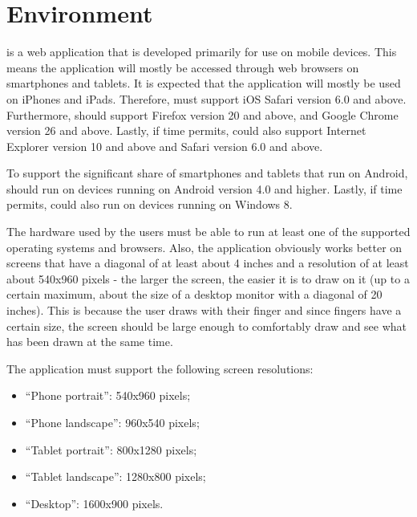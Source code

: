 \section{Environment}
\label{sec:env}
\projectname{} is a web application that is developed primarily for use on mobile devices. This means the application will mostly be accessed through web browsers on smartphones and tablets. It is expected that the application will mostly be used on iPhones and iPads. Therefore, \projectname{} must support iOS Safari version 6.0 and above. Furthermore, \projectname{} should support Firefox version 20 and above, and Google Chrome version 26 and above. Lastly, if time permits, \projectname{} could also support Internet Explorer version 10 and above and Safari version 6.0 and above.

To support the significant share of smartphones and tablets that run on Android, \projectname{} should run on devices running on Android version 4.0 and higher. Lastly, if time permits, \projectname{} could also run on devices running on Windows 8.

The hardware used by the users must be able to run at least one of the supported operating systems and browsers. Also, the application obviously works better on screens that have a diagonal of at least about 4 inches and a resolution of at least about 540x960 pixels - the larger the screen, the easier it is to draw on it (up to a certain maximum, about the size of a desktop monitor with a diagonal of 20 inches). This is because the user draws with their finger and since fingers have a certain size, the screen should be large enough to comfortably draw and see what has been drawn at the same time. %

The application must support the following screen resolutions:
\begin{itemize}
	\item ``Phone portrait'': 540x960 pixels;
	\item ``Phone landscape'': 960x540 pixels;
	\item ``Tablet portrait'': 800x1280 pixels;
	\item ``Tablet landscape'': 1280x800 pixels;
	\item ``Desktop'': 1600x900 pixels.
\end{itemize}

